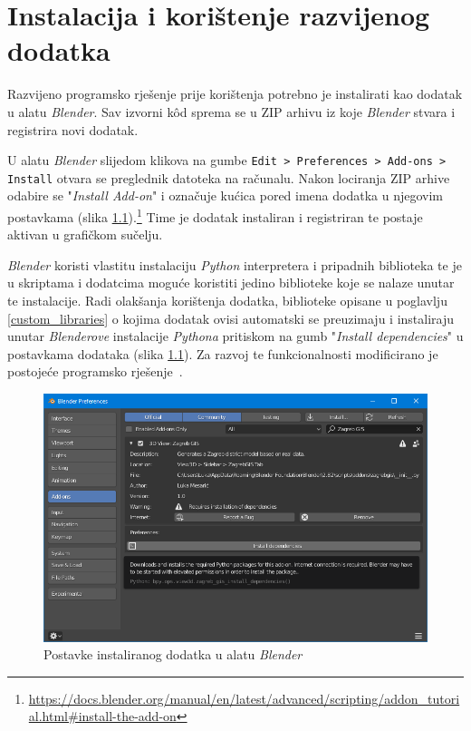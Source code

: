 \documentclass[times, utf8, zavrsni, numeric]{fer}
\begin{document}
\chapter{Instalacija i korištenje razvijenog dodatka}

	Razvijeno programsko rješenje prije korištenja potrebno je instalirati kao dodatak u alatu \textit{Blender}.
	Sav izvorni kôd sprema se u ZIP arhivu iz koje \textit{Blender} stvara i registrira novi dodatak.
	
	U alatu \textit{Blender} slijedom klikova na gumbe \texttt{Edit > Preferences > Add-ons > Install} otvara se preglednik datoteka na računalu.
	Nakon lociranja ZIP arhive odabire se "\textit{Install Add-on}" i označuje kućica  pored imena dodatka u njegovim postavkama (slika \ref{fig:install_dependencies_button}).\footnote{\url{https://docs.blender.org/manual/en/latest/advanced/scripting/addon_tutorial.html#install-the-add-on}}
	Time je dodatak instaliran i registriran te postaje aktivan u grafičkom sučelju.
	
	\textit{Blender} koristi vlastitu instalaciju \textit{Python} interpretera i pripadnih biblioteka te je u skriptama i dodatcima moguće koristiti jedino biblioteke koje se nalaze unutar te instalacije.
	Radi olakšanja korištenja dodatka, biblioteke opisane u poglavlju \ref{custom_libraries} o kojima dodatak ovisi automatski se preuzimaju i instaliraju unutar \textit{Blenderove} instalacije \mbox{\textit{Pythona}} pritiskom na gumb "\textit{Install dependencies}" u postavkama dodataka (slika \ref{fig:install_dependencies_button}).
	Za razvoj te funkcionalnosti modificirano je postojeće programsko rješenje~\cite{github:gutzkow}.
	
	\begin{figure}
		\includegraphics[width=\linewidth]{figures/install_dependencies_button.png}
		\centering
		\caption{Postavke instaliranog dodatka u alatu \textit{Blender}}
		\label{fig:install_dependencies_button}
	\end{figure}
	
\end{document}
